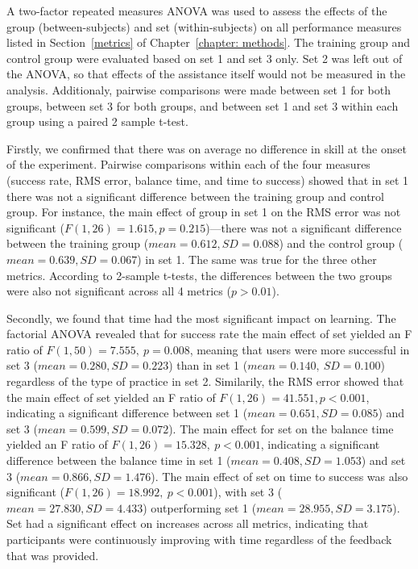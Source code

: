 \documentclass[12pt]{article}
\begin{document}
A two-factor repeated measures ANOVA was used to assess the effects of the group (between-subjects) and set (within-subjects) on all performance measures listed in Section~\ref{metrics} of Chapter~\ref{chapter: methods}. The training group and control group were evaluated based on set 1 and set 3 only. Set 2 was left out of the ANOVA, so that effects of the assistance itself would not be measured in the analysis. Additionaly, pairwise comparisons were made between set 1 for both groups, between set 3 for both groups, and between set 1 and set 3 within each group using a paired 2 sample t-test. 

Firstly, we confirmed that there was on average no difference in skill at the onset of the experiment. Pairwise comparisons within each of the four measures (success rate, RMS error, balance time, and time to success) showed that in set 1 there was not a significant difference between the training group and control group. For instance, the main effect of group in set 1 on the RMS error was not significant ($F(1,26)=1.615, p = 0.215$)---there was not a significant difference between the training group ($mean =0.612, SD =0.088$) and the control group ($mean = 0.639 , SD=0.067$) in set 1. The same was true for the three other metrics. According to 2-sample t-tests, the differences between the two groups were also not significant across all 4 metrics ($p>0.01$).

Secondly, we found that time had the most significant impact on learning. The factorial ANOVA revealed that for success rate the main effect of set yielded an F ratio of $F(1,50)=7.555,\ p=0.008$, meaning that users were more successful in set 3 ($mean =0.280 , SD = 0.223$) than in set 1 ($mean = 0.140,\ SD = 0.100$) regardless of the type of practice in set 2. Similarily, the RMS error showed that the main effect of set yielded an F ratio of $F(1,26) = 41.551, p<0.001$, indicating a significant difference between set 1 ($mean =0.651, SD =0.085$) and set 3 ($mean =0.599, SD =0.072$). The main effect for set on the balance time yielded an F ratio of $F(1,26)=15.328,\ p<0.001$, indicating a significant difference between the balance time in set 1 ($mean = 0.408, SD = 1.053$) and set 3 ($mean = 0.866, SD = 1.476$). The main effect of set on time to success was also significant ($F(1,26)=18.992,\ p<0.001$), with set 3 ($mean = 27.830, SD = 4.433$) outperforming set 1 ($mean = 28.955,SD =3.175$). Set had a significant effect on increases across all metrics, indicating that participants were continuously improving with time regardless of the feedback that was provided. 
\end{document}
